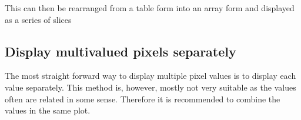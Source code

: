 \documentclass[letterpaper,10pt,english]{sphinxmanual}
\begin{document}
\sphinxAtStartPar
This can then be rearranged from a table form into an array form and displayed as a series of slices


\subsection{Display multi\sphinxhyphen{}valued pixels separately}
\label{\detokenize{01-Introduction:display-multi-valued-pixels-separately}}
\sphinxAtStartPar
The most straight forward way to display multiple pixel values is to display each value separately. This method is, however, mostly not very suitable as the values often are related in some sense. Therefore it is recommended to combine the values in the same plot.

\begin{sphinxVerbatim}[commandchars=\\\{\}]
     
\PYG{p}{[}\PYG{p}{]} \PYG{p}{[}\PYG{p}{]}   \PYG{p}{[}\PYG{p}{]}   
\PYG{p}{[}\PYG{p}{]} \PYG{p}{[}\PYG{p}{]}   \PYG{p}{[}\PYG{p}{]}   
\end{sphinxVerbatim}
\end{document}
